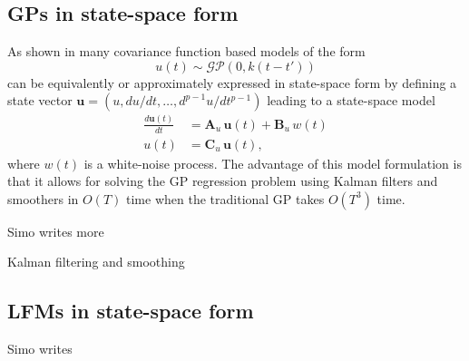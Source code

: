\documentclass[journal]{IEEEtran}
\newcommand{\simo}[1]{{\color{red}#1}}
\begin{document}
\subsection{GPs in state-space form}
As shown in \cite{Hartikainen+Sarkka:2010,Sarkka+Solin+Hartikainen:2013} many covariance function based models of the form
%
\begin{equation}
  u(t) \sim \mathcal{GP}(0,k(t - t'))
\end{equation}
%
can be equivalently or approximately expressed in state-space form by defining a state vector $\mathbf{u} = (u, du/dt,\ldots,d^{p-1}u/dt^{p-1})$ leading to a state-space model
%
\begin{equation}
\begin{split}
  \frac{d\mathbf{u}(t)}{dt}
  &= \mathbf{A}_u \, \mathbf{u}(t) + \mathbf{B}_u \, w(t) \\
  u(t) &= \mathbf{C}_u \, \mathbf{u}(t),
\end{split}
\label{eq:ssu}
\end{equation}
%
where $w(t)$ is a white-noise process. The advantage of this model formulation is that it allows for solving the GP regression problem using Kalman filters and smoothers \cite{Sarkka:2013} in $O(T)$ time when the traditional GP takes $O(T^3)$ time.

\simo{Simo writes more}

\simo{Kalman filtering and smoothing}


\subsection{LFMs in state-space form}
%
\simo{Simo writes}
\end{document}
